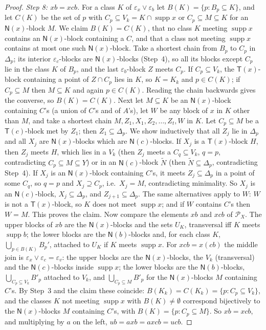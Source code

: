 \documentclass[11pt]{amsart}
\theoremstyle{definition}
\renewcommand{\P}{\mathcal{P}}
\newcommand{\supp}{\operatorname{supp}}
\newcommand{\T}{\mathsf{T}}
\newcommand{\N}{\mathsf{N}}
\begin{document}
\begin{proof}
\emph{Step 8: $xb=xcb$.} For a class $K$ of $\varepsilon_x\vee\varepsilon_b$ let $B(K)=\{p:B_p\subseteq K\}$, and let $C(K)$ be the set of $p$ with $C_p\subseteq V_k=K\cap\supp x$ or $C_p\subseteq M\subseteq K$ for an $\N(x)$-block $M$. We claim $B(K)=C(K)$, that no class $K$ meeting $\supp x$ contains an $\N(x)$-block containing a $C$, and that a class not meeting $\supp x$ contains at most one such $\N(x)$-block. Take a shortest chain from $B_p$ to $C_p$ in $\Delta_p$; its interior $\varepsilon_c$-blocks are $\N(x)$-blocks (Step~4), so all its blocks except $C_p$ lie in the class $K$ of $B_p$, and the last $\varepsilon_b$-block $Z$ meets $C_p$. If $C_p\subseteq V_k$, the $\T(x)$-block containing a point of $Z\cap C_p$ lies in $K$, so $K=K_k$ and $p\in C(K)$; if $C_p\subseteq M$ then $M\subseteq K$ and again $p\in C(K)$. Reading the chain backwards gives the converse, so $B(K)=C(K)$. Next let $M\subseteq K$ be an $\N(x)$-block containing $C$'s (a union of $C$'s and of $A$'s), let $W$ be any block of $x$ in $K$ other than $M$, and take a shortest chain $M,Z_1,X_1,Z_2,\dots,Z_t,W$ in $K$. Let $C_p\subseteq M$ be a $\T(c)$-block met by $Z_1$; then $Z_1\subseteq\Delta_p$. We show inductively that all $Z_j$ lie in $\Delta_p$ and all $X_j$ are $\N(x)$-blocks which are $\N(c)$-blocks. If $X_j$ is a $\T(x)$-block $H$, then $Z_j$ meets $H$, which lies in a $V_k$ (then $Z_j$ meets a $C_q\subseteq V_k$, $q=p$, contradicting $C_p\subseteq M\subseteq Y$) or in an $\N(c)$-block $\tilde N$ (then $\tilde N\subseteq\Delta_p$, contradicting Step~4). If $X_j$ is an $\N(x)$-block containing $C$'s, it meets $Z_j\subseteq\Delta_p$ in a point of some $C_q$, so $q=p$ and $X_j\supseteq C_p$, i.e.\ $X_j=M$, contradicting minimality. So $X_j$ is an $\N(c)$-block, $X_j\subseteq\Delta_p$, and $Z_{j+1}\subseteq\Delta_p$. The same alternatives apply to $W$: $W$ is not a $\T(x)$-block, so $K$ does not meet $\supp x$; and if $W$ contains $C$'s then $W=M$. This proves the claim. Now compare the elements $xb$ and $xcb$ of $\P_X$. The upper blocks of $xb$ are the $\N(x)$-blocks and the sets $U_K$, transversal iff $K$ meets $\supp b$; the lower blocks are the $\N(b)$-blocks and, for each class $K$, $\bigcup_{p\in B(K)}B_p'$, attached to $U_K$ if $K$ meets $\supp x$. For $xcb=x(cb)$ the middle join is $\varepsilon_x\vee\varepsilon_c=\varepsilon_v$: the upper blocks are the $\N(x)$-blocks, the $V_k$ (transversal) and the $\N(c)$-blocks inside $\supp x$; the lower blocks are the $\N(b)$-blocks, $\bigcup_{C_p\subseteq V_k}B'_p$ attached to $V_k$, and $\bigcup_{C_p\subseteq M}B'_p$ for the $\N(x)$-blocks $M$ containing $C$'s. By Step~3 and the claim these coincide: $B(K_k)=C(K_k)=\{p:C_p\subseteq V_k\}$, and the classes $K$ not meeting $\supp x$ with $B(K)\ne\emptyset$ correspond bijectively to the $\N(x)$-blocks $M$ containing $C$'s, with $B(K)=\{p:C_p\subseteq M\}$. So $xb=xcb$, and multiplying by $a$ on the left, $ub=axb=axcb=ucb$.


\end{proof}
\end{document}
